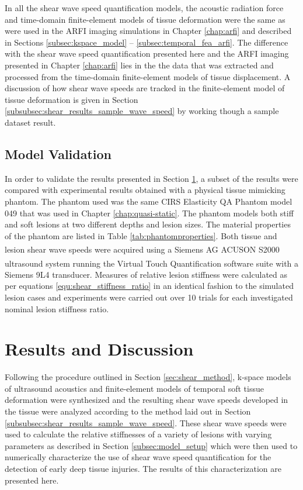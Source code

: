 			In all the shear wave speed quantification models, the acoustic radiation force and time-domain finite-element models of tissue deformation were the same as were used in the ARFI imaging simulations in Chapter \ref{chap:arfi} and described in Sections \ref{subsec:kspace_model} -- \ref{subsec:temporal_fea_arfi}. The difference with the shear wave speed quantification presented here and the ARFI imaging presented in Chapter \ref{chap:arfi} lies in the the data that was extracted and processed from the time-domain finite-element models of tissue displacement. A discussion of how shear wave speeds are tracked in the finite-element model of tissue deformation is given in Section \ref{subsubsec:shear_results_sample_wave_speed} by working though a sample dataset result.

		\subsection{Model Validation}
		\label{subsec:shear_model_validation}
			In order to validate the results presented in Section \ref{subsec:shear_results}, a subset of the results were compared with experimental results obtained with a physical tissue mimicking phantom. The phantom used was the same CIRS Elasticity QA Phantom model 049 that was used in Chapter \ref{chap:quasi-static}. The phantom models both stiff and soft lesions at two different depths and lesion sizes. The material properties of the phantom are listed in Table \ref{tab:phantomproperties}. Both tissue and lesion shear wave speeds were acquired using a Siemens AG ACUSON S2000\textsuperscript{\texttrademark} ultrasound system running the Virtual Touch\textsuperscript{\texttrademark} Quantification software suite with a Siemens 9L4 transducer. Measures of relative lesion stiffness were calculated as per equations \ref{equ:shear_stiffness_ratio} in an identical fashion to the simulated lesion cases and experiments were carried out over 10 trials for each investigated nominal lesion stiffness ratio.

	\section{Results and Discussion}
	\label{subsec:shear_results}
		Following the procedure outlined in Section \ref{sec:shear_method}, k-space models of ultrasound acoustics and finite-element models of temporal soft tissue deformation were synthesized and the resulting shear wave speeds developed in the tissue were analyzed according to the method laid out in Section \ref{subsubsec:shear_results_sample_wave_speed}. These shear wave speeds were used to calculate the relative stiffnesses of a variety of lesions with varying parameters as described in Section \ref{subsec:model_setup} which were then used to numerically characterize the use of shear wave speed quantification for the detection of early deep tissue injuries. The results of this characterization are presented here.

